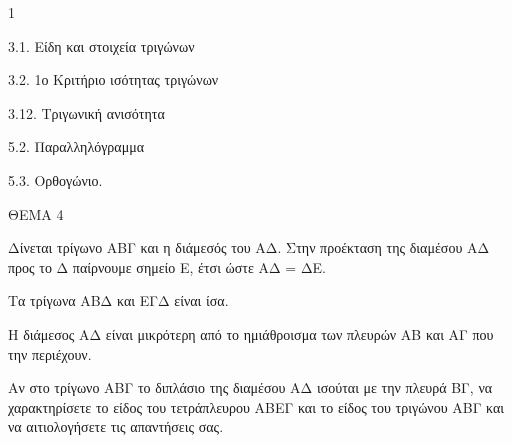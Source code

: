 \begin{ylh}{1}
    \item 3.1. Είδη και στοιχεία τριγώνων
    \item 3.2. 1ο Κριτήριο ισότητας τριγώνων
    \item 3.12. Τριγωνική ανισότητα
    \item 5.2. Παραλληλόγραμμα
    \item 5.3. Ορθογώνιο.
\end{ylh}

ΘΕΜΑ 4

Δίνεται τρίγωνο ΑΒΓ και η διάμεσός του ΑΔ. Στην προέκταση της διαμέσου ΑΔ προς το Δ παίρνουμε σημείο Ε, έτσι ώστε ΑΔ = ΔΕ.

\begin{alist}
\item Να αποδείξετε ότι :

.}
\end{alist}
\begin{alist}
\item
  Τα τρίγωνα ΑΒΔ και ΕΓΔ είναι ίσα. 
\item
  Η διάμεσος ΑΔ είναι μικρότερη από το ημιάθροισμα των πλευρών ΑΒ και ΑΓ που την περιέχουν. 

\item Αν στο τρίγωνο ΑΒΓ το διπλάσιο της διαμέσου ΑΔ ισούται με την πλευρά ΒΓ, να χαρακτηρίσετε το είδος του τετράπλευρου ΑΒΕΓ και το είδος του τριγώνου ΑΒΓ και να αιτιολογήσετε τις απαντήσεις σας.

\end{alist}
